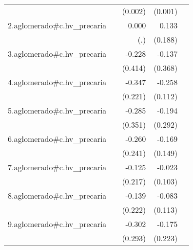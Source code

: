 {\begin{longtable}{l*{4}{D{.}{.}{-1}}}
            &                     &     (0.002)         &     (0.001)         &                     \\
\addlinespace
2.aglomerado#c.hv\_precaria&                     &       0.000         &       0.133         &                     \\
            &                     &         (.)         &     (0.188)         &                     \\
\addlinespace
3.aglomerado#c.hv\_precaria&                     &      -0.228         &      -0.137         &                     \\
            &                     &     (0.414)         &     (0.368)         &                     \\
\addlinespace
4.aglomerado#c.hv\_precaria&                     &      -0.347         &      -0.258\sym{*}  &                     \\
            &                     &     (0.221)         &     (0.112)         &                     \\
\addlinespace
5.aglomerado#c.hv\_precaria&                     &      -0.285         &      -0.194         &                     \\
            &                     &     (0.351)         &     (0.292)         &                     \\
\addlinespace
6.aglomerado#c.hv\_precaria&                     &      -0.260         &      -0.169         &                     \\
            &                     &     (0.241)         &     (0.149)         &                     \\
\addlinespace
7.aglomerado#c.hv\_precaria&                     &      -0.125         &      -0.023         &                     \\
            &                     &     (0.217)         &     (0.103)         &                     \\
\addlinespace
8.aglomerado#c.hv\_precaria&                     &      -0.139         &      -0.083         &                     \\
            &                     &     (0.222)         &     (0.113)         &                     \\
\addlinespace
9.aglomerado#c.hv\_precaria&                     &      -0.302         &      -0.175         &                     \\
            &                     &     (0.293)         &     (0.223)         &                     \\

\end{longtable}}
